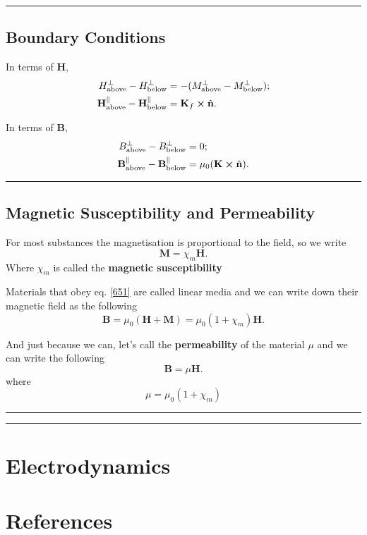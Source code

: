 \documentclass[12pt,english]{article}
\numberwithin{equation}{subsection}
\let\oldhat\hat
\renewcommand{\vec}[1]{\mathbf{#1}}
\renewcommand{\hat}[1]{\oldhat{\mathbf{#1}}}
\begin{document}
\par\noindent\rule{\textwidth}{0.4pt}
\subsection{Boundary Conditions}
In terms of $\vec{H}$,
\begin{align}
    H_{\text{above}}^{\bot} - H_{\text{below}}^{\bot} &= -(M_{\text{above}}^{\bot}-M_{\text{below}}^{\bot});\\
    \vec{H}_{\text{above}}^{\parallel} - \vec{H}_{\text{below}}^{\parallel} &= \vec{K}_f \cross \hat{n}.
\end{align}

In terms of $\vec{B}$,
\begin{align}
    B_{\text{above}}^{\bot} - B_{\text{below}}^{\bot} &= 0;\\
    \vec{B}_{\text{above}}^{\parallel} - \vec{B}_{\text{below}}^{\parallel} &= \mu_0(\vec{K}\cross \hat{n}).
\end{align}

\par\noindent\rule{\textwidth}{0.4pt}
\subsection{Magnetic Susceptibility and Permeability}
For most substances the magnetisation is proportional to the field, so we write
\begin{equation}
    \vec{M} = \chi_m \vec{H}.\label{651}
\end{equation}
Where $\chi_m$ is called the \textbf{magnetic susceptibility}

Materials that obey eq. \ref{651} are called linear media and we can write down their magnetic field as the following
\begin{equation}
    \vec{B} = \mu_0(\vec{H} + \vec{M}) = \mu_0(1+\chi_m)\vec{H}.
\end{equation}

And just because we can, let's call the \textbf{permeability} of the material $\mu$ and we can write the following
\begin{equation}
    \vec{B} = \mu \vec{H}.
\end{equation}
where 
\begin{equation}
    \mu = \mu_0(1+\chi_m)
\end{equation}
\par\noindent\rule{\textwidth}{0.4pt}
\par\noindent\rule{\textwidth}{0.4pt}

\section{Electrodynamics}

\newpage
\section*{References}
%
\printbibliography
[heading = none]

\end{document}
